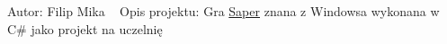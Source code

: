 Autor\+: Filip Mika ~\newline
Opis projektu\+: Gra \mbox{\hyperlink{namespace_saper}{Saper}} znana z Windowsa wykonana w C\# jako projekt na uczelnię 
